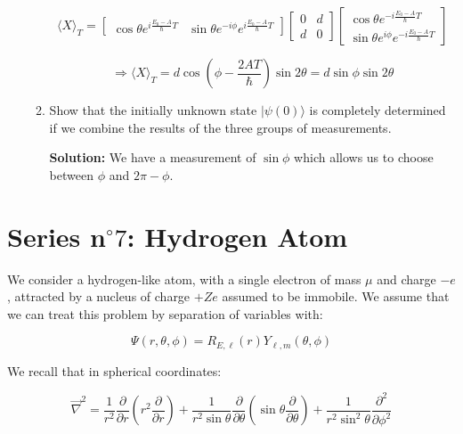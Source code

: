 \documentclass{article}
\begin{document}
\begin{enumerate}
\begin{enumerate}
{        $$
        \langle X \rangle_{T} = \begin{bmatrix}
        \cos \theta e^{i \frac{E_{0} - A}{\hbar} T} & \sin \theta e^{-i \phi} e^{i \frac{E_{0} - A}{\hbar} T}
        \end{bmatrix} \begin{bmatrix}
        0 & d \\
        d & 0
        \end{bmatrix} \begin{bmatrix}
        \cos \theta e^{-i \frac{E_{0} - A}{\hbar} T} \\
        \sin \theta e^{i \phi} e^{-i \frac{E_{0} - A}{\hbar} T}
        \end{bmatrix}
        $$

        $$
        \Longrightarrow \langle X \rangle_{T} = d \cos \left(\phi - \frac{2 A T}{\hbar}\right) \sin 2 \theta = d \sin \phi \sin 2 \theta
        $$}

        \item Show that the initially unknown state $|\psi(0)\rangle$ is completely determined if we combine the results of the three groups of measurements.

        {\color{red}\textbf{Solution:} We have a measurement of $\sin \phi$ which allows us to choose between $\phi$ and $2 \pi - \phi$.}

    \end{enumerate}

\end{enumerate}

\newpage

    \section*{Series n$^{\circ} 7$: Hydrogen Atom}

    We consider a hydrogen-like atom, with a single electron of mass $\mu$ and charge $-e$, attracted by a nucleus of charge $+Ze$ assumed to be immobile. We assume that we can treat this problem by separation of variables with:

    $$
    \Psi(r, \theta, \phi) = R_{E, \ell}(r) Y_{\ell, m}(\theta, \phi)
    $$

    We recall that in spherical coordinates:

    $$
    \vec{\nabla}^{2} = \frac{1}{r^{2}} \frac{\partial}{\partial r}\left(r^{2} \frac{\partial}{\partial r}\right) + \frac{1}{r^{2} \sin \theta} \frac{\partial}{\partial \theta}\left(\sin \theta \frac{\partial}{\partial \theta}\right) + \frac{1}{r^{2} \sin ^{2} \theta} \frac{\partial^{2}}{\partial \phi^{2}}
    $$
\end{document}
